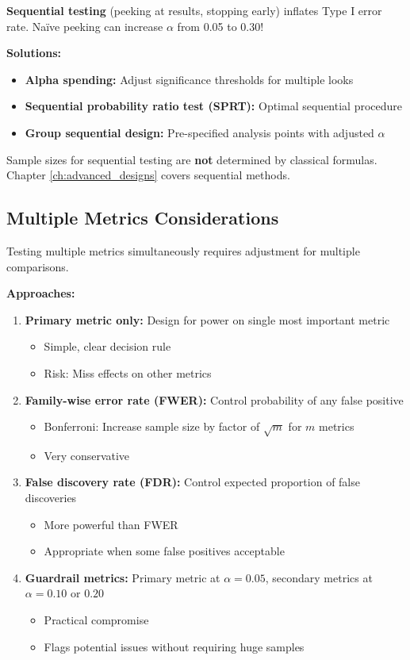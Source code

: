 \textbf{Sequential testing} (peeking at results, stopping early) inflates Type I error rate. Naïve peeking can increase $\alpha$ from 0.05 to 0.30!

\textbf{Solutions:}
\begin{itemize}
    \item \textbf{Alpha spending:} Adjust significance thresholds for multiple looks
    \item \textbf{Sequential probability ratio test (SPRT):} Optimal sequential procedure
    \item \textbf{Group sequential design:} Pre-specified analysis points with adjusted $\alpha$
\end{itemize}

Sample sizes for sequential testing are \textbf{not} determined by classical formulas. Chapter \ref{ch:advanced_designs} covers sequential methods.

\subsection{Multiple Metrics Considerations}

Testing multiple metrics simultaneously requires adjustment for multiple comparisons.

\textbf{Approaches:}
\begin{enumerate}
    \item \textbf{Primary metric only:} Design for power on single most important metric
    \begin{itemize}
        \item Simple, clear decision rule
        \item Risk: Miss effects on other metrics
    \end{itemize}

    \item \textbf{Family-wise error rate (FWER):} Control probability of any false positive
    \begin{itemize}
        \item Bonferroni: Increase sample size by factor of $\sqrt{m}$ for $m$ metrics
        \item Very conservative
    \end{itemize}

    \item \textbf{False discovery rate (FDR):} Control expected proportion of false discoveries
    \begin{itemize}
        \item More powerful than FWER
        \item Appropriate when some false positives acceptable
    \end{itemize}

    \item \textbf{Guardrail metrics:} Primary metric at $\alpha = 0.05$, secondary metrics at $\alpha = 0.10$ or $0.20$
    \begin{itemize}
        \item Practical compromise
        \item Flags potential issues without requiring huge samples
    \end{itemize}
\end{enumerate}

